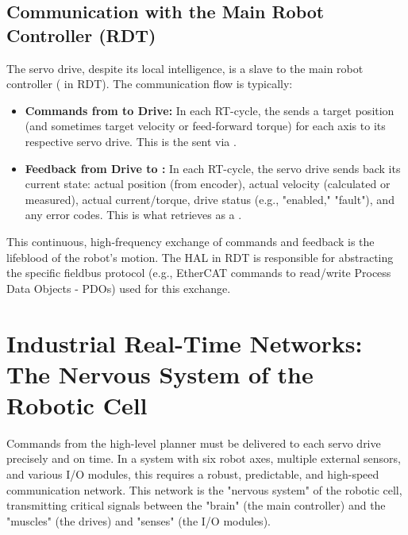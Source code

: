 \subsection{Communication with the Main Robot Controller (RDT)}
\label{subsec:servo_main_controller_comm}

The servo drive, despite its local intelligence, is a slave to the main robot controller ( in RDT). The communication flow is typically:
\begin{itemize}
    \item \textbf{Commands from  to Drive:}
    In each RT-cycle, the  sends a target position (and sometimes target velocity or feed-forward torque) for each axis to its respective servo drive. This is the  sent via .
    \item \textbf{Feedback from Drive to :}
    In each RT-cycle, the servo drive sends back its current state: actual position (from encoder), actual velocity (calculated or measured), actual current/torque, drive status (e.g., "enabled," "fault"), and any error codes. This is what  retrieves as a .
\end{itemize}
This continuous, high-frequency exchange of commands and feedback is the lifeblood of the robot's motion. The HAL in RDT is responsible for abstracting the specific fieldbus protocol (e.g., EtherCAT commands to read/write Process Data Objects - PDOs) used for this exchange.










\section{Industrial Real-Time Networks: The Nervous System of the Robotic Cell}
\label{sec:rt_networks}

Commands from the high-level planner must be delivered to each servo drive precisely and on time. In a system with six robot axes, multiple external sensors, and various I/O modules, this requires a robust, predictable, and high-speed communication network. This network is the "nervous system" of the robotic cell, transmitting critical signals between the "brain" (the main controller) and the "muscles" (the drives) and "senses" (the I/O modules).

